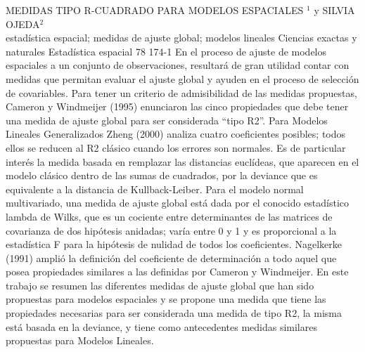 \A
{MEDIDAS TIPO R-CUADRADO PARA MODELOS ESPACIALES}
{$^1$ y SILVIA OJEDA$^2$}
{
\\}
{estadística espacial; medidas de ajuste global; modelos lineales} 
 {Ciencias exactas y naturales} 
 {Estadística espacial} 
 {78} 
 {174-1}
{En el proceso de ajuste de modelos espaciales a un conjunto de observaciones, resultará de gran utilidad contar con medidas que permitan evaluar el ajuste global y ayuden en el proceso de selección de covariables. Para tener un criterio de admisibilidad de las medidas propuestas, Cameron y Windmeijer (1995) enunciaron las cinco propiedades que debe tener una medida de ajuste global para ser considerada “tipo R2”. Para Modelos Lineales Generalizados Zheng (2000) analiza cuatro coeficientes posibles; todos ellos se reducen al R2 clásico cuando los errores son normales. Es de particular interés la medida basada en remplazar las distancias euclídeas, que aparecen en el modelo clásico dentro de las sumas de cuadrados, por la deviance que es equivalente a la distancia de Kullback-Leiber. Para el modelo normal multivariado, una medida de ajuste global está dada por el conocido estadístico lambda de Wilks, que es un cociente entre determinantes de las matrices de covarianza de dos hipótesis anidadas; varía entre 0 y 1 y es proporcional a la estadística F para la hipótesis de nulidad de todos los coeficientes. Nagelkerke (1991) amplió la definición del coeficiente de determinación a todo aquel que posea propiedades similares a las definidas por Cameron y Windmeijer. En este trabajo se resumen las diferentes medidas de ajuste global que han sido propuestas para modelos espaciales y se propone una medida que tiene las propiedades necesarias para ser considerada una medida de tipo R2, la misma está basada en la deviance, y tiene como antecedentes medidas similares propuestas para Modelos Lineales.}

